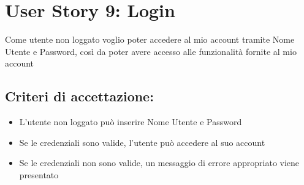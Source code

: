 \section*{User Story 9: Login}
    Come utente non loggato voglio poter accedere al mio account tramite Nome Utente e Password, così da poter avere accesso alle funzionalità fornite al mio account
    \subsection*{Criteri di accettazione:}  
    \begin{itemize}  
        \item L'utente non loggato può inserire Nome Utente e Password
        \item Se le credenziali sono valide, l'utente può accedere al suo account
        \item Se le credenziali non sono valide, un messaggio di errore appropriato viene presentato
    \end{itemize}  
